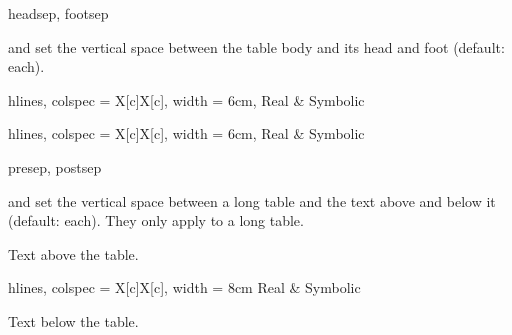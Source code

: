 \begin{codedescribe}[
        key,
        new=2021L
    ]{headsep, footsep}
    \begin{codesyntax}
    \end{codesyntax}
     and  set the vertical space between the table body and its head and foot (default: \val{6pt} each).

    \begin{codestore}[st=outer:headsep]
        \begin{talltblr}[
            caption = {The default spacing},
            note{a} = {Impossible.},
            ]{
            hlines, colspec = {X[c]X[c]}, width = 6cm,
            }
            Real & Symbolic
        \end{talltblr}\quad
        \begin{talltblr}[
            caption = {A wider spacing},
            note{a} = {Impossible.},
            headsep = 18pt, footsep = 18pt,
            ]{
            hlines, colspec = {X[c]X[c]}, width = 6cm,
            }
            Real & Symbolic
        \end{talltblr}\end{codestore}
    \begin{center}
    \end{center}
\end{codedescribe}

\begin{codedescribe}[
        key,
        new=2021L
    ]{presep, postsep}
    \begin{codesyntax}
    \end{codesyntax}
     and  set the vertical space between a long table and the text above and below it (default:  each). They only apply to a long table.
\end{codedescribe}

\begin{codestore}[st=outer:presep]
    Text above the table.
    \begin{longtblr}[
        presep = 2pt,
        postsep = 3cm,
        caption = {Close to the text above},
        ]{hlines, colspec = {X[c]X[c]}, width = 8cm}
        Real & Symbolic
    \end{longtblr}
    Text below the table.\end{codestore}

